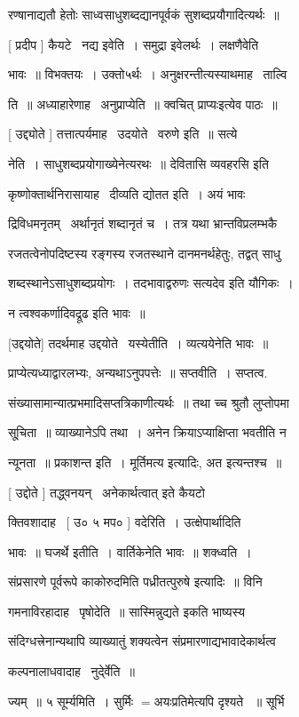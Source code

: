 \documentclass[11pt, openany]{book}
\begin{document}
रण्षानाद्यतौ हेतोः साध्वसाधुशब्दद्यानपूर्वकं सुशब्दप्रयौगादित्यर्थः~॥


[ प्रदीप ] कैयटे \textendash\ नद्य इवेति~। समुद्रा इवेलर्थः~। लक्षणैवेति 

भावः~॥ विभक्तयः~। उक्तो५र्थः~। अनुक्षरन्तीत्यस्याथमाह \textendash\ ताल्वि \textendash\ 

ति~॥ अध्याहारेणाह \textendash\ अनुप्राप्येति~॥ क्वचित् {\qt प्राप्यःइत्येव पाठः~॥}

[ उद्द्योते ] तत्तात्पर्यमाह \textendash\ उदयोते \textendash\ वरुणे इति~॥ सत्ये \textendash\ 

नेति~। साधुशब्दप्रयोगाख्येनेत्यरथः~॥ {\qt देवितासि व्यवहरसि} इति 

कृष्णोक्तार्थनिरासायाह \textendash\ दीव्यति द्योतत इति~। अयं भावः \textendash\ 

द्रिविधमनृतम् \textendash\ अर्थानृतं शब्दानृतं च~। तत्र यथा भ्रान्तविप्रलम्भकै 

रजतत्वेनोपदिष्टस्य रङ्गस्य रजतस्थाने दानमनर्थहेतुः, तद्वत् साधु \textendash\ 

शब्दस्थानेऽसाधुशब्दप्रयोगः~। तदभावाद्वरुणः सत्यदेव इति यौगिकः~। 

न त्वश्वकर्णादिवद्रूढ इति भावः~॥ 

[उद्दयोते] तदर्थमाह उद्दयोते \textendash\ यस्येतीति~। व्यत्ययेनेति भावः~॥ 

प्राप्येत्यध्याद्वारलभ्यः, अन्यथाऽनुपपत्तेः~॥ सप्तवीति~। सप्तत्व. 

संख्यासामान्यात्प्रभमादिसप्तत्रिकाणीत्यर्थः~॥ तथा च्च श्रुतौ लुप्तोपमा


सू्चिता~॥ व्याख्यानेऽपि तथा~। अनेन क्रियाऽप्याक्षिप्ता भवतीति न 

न्यूनता~॥ प्रकाशन्त इति~। मूर्तिमत्य इत्यादिः, अत इत्यन्तश्च~॥ 

[ उद्दोते ] तद्ध्वनयन् \textendash\ {\qt अनेकार्थत्वात्} इते कैयटो \textendash\ 

क्तिवशादाह \textendash\ [ उ० ५ मप० ] वदेरिति~। उत्क्षेपार्थादिति 

भावः~॥ घजर्थे इतीति~। वार्तिकेनेति भावः~॥ शक्ध्वति~। 

संप्रसारणे पूर्वरूपे काकोरुदमिति पध्रीतत्पुरुषे इत्यादिः~॥ विनि \textendash\ 

गमनाविरहादाह \textendash\ पृषोदेति~॥ {\qt सास्मिन्नुद्यते} इकति भाष्यस्य 

संदिग्धत्त्रेनान्यथापि व्याख्यातुं शक्यत्वेन
संप्रमारणाद्यभावादेकार्थत्व \textendash\ 

कल्पनालाधवादाह \textendash\ नुदे्र्वेति~॥ 

ज्यम्~॥ ५ सूर्म्यमिति~। सुर्मिः $=$अयःप्रतिमेत्यपि दृश्यते ~॥ सूर्भि 
\end{document}
